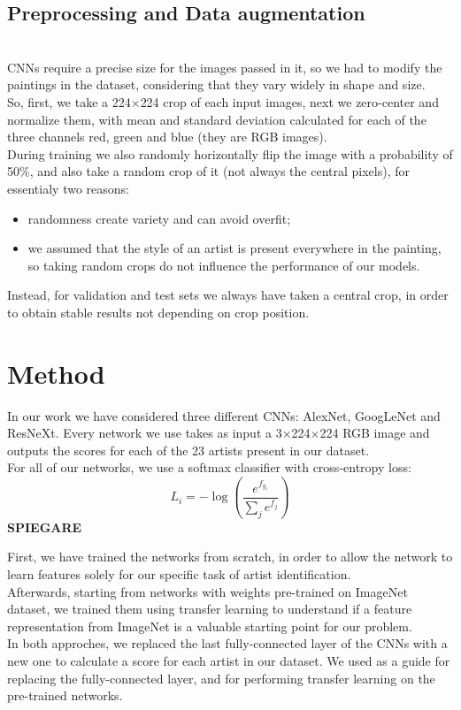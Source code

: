 \documentclass{article}
\begin{document}
\subsection{Preprocessing and Data augmentation}\mbox{}\\
CNNs require a precise size for the images passed in it, so we had to modify the paintings in the dataset, considering that they vary widely in shape and size.\\
So, first, we take a 224$\times$224 crop of each input images, next we zero-center and normalize them, with mean and standard deviation calculated for each of the three channels red, green and blue (they are RGB images).  \\
During training we also randomly horizontally flip the image with a probability of 50\%, and also take a random crop of it (not always the central pixels), for essentialy two reasons:
\begin{itemize}
	\item randomness create variety and can avoid overfit;
	\item we assumed that the style of an artist is present everywhere in the painting, so taking random crops do not influence the performance of our models.
\end{itemize}
Instead, for validation and test sets we always have taken a central crop, in order to obtain stable results not depending on crop position.

\section{Method}\label{method}
In our work we have considered three different CNNs: AlexNet, GoogLeNet and ResNeXt. Every network we use takes as input a
3$\times$224$\times$224 RGB image and outputs the scores for each of the 23 artists present in our dataset.
\\
For all of our networks, we use a softmax classifier with
cross-entropy loss:
\begin{equation}
L_{i}=-\log \left(\frac{e^{f_{y_{i}}}}{\sum_{j} e^{f_{j}}}\right)
\end{equation}
\textbf{SPIEGARE}

First, we have trained the networks from scratch, in order to allow the network to learn features solely for our specific task of artist identification. \\
Afterwards, starting from networks with weights pre-trained on ImageNet dataset, we trained them using transfer learning to understand if a feature representation from ImageNet is a valuable starting point for our problem.\\
In both approches, we replaced the last fully-connected layer of the CNNs with a new one to calculate a score for each artist in
our dataset. We used \cite{pytorchguide} as a guide for replacing the fully-connected layer, and for performing transfer learning on the pre-trained networks.
\end{document}
